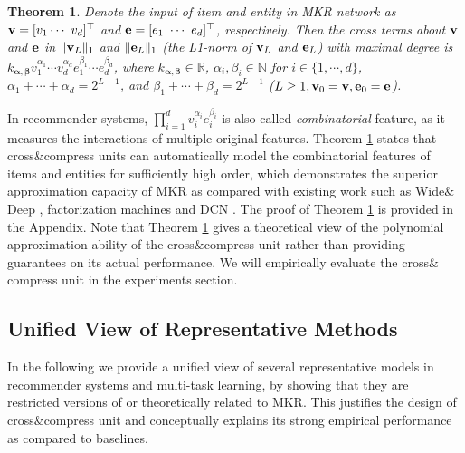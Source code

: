 \documentclass[sigconf]{acmart}
\newtheorem{theorem}{Theorem}
\begin{document}
		\begin{theorem}
		\label{thm:1}
			Denote the input of item and entity in MKR network as ${\bf v} = [v_1 \cdots \ v_d]^\top$ and ${\bf e} = [e_1 \ \cdots \ e_d]^\top$, respectively.
			Then the cross terms about ${\bf v}$ and ${\bf e}$ in $\|{\bf v}_L\|_1$ and $\|{\bf e}_L\|_1$ (the L1-norm of ${\bf v}_L$ and ${\bf e}_L$) with maximal degree is $k_{\bm \alpha, \bm \beta} v_1^{\alpha_1} \cdots v_d^{\alpha_d} e_1^{\beta_1} \cdots e_d^{\beta_d}$, where $k_{\bm \alpha, \bm \beta} \in \mathbb R$, $\alpha_i, \beta_i \in \mathbb N$ for $i \in \{1, \cdots, d\}$, $\alpha_1 + \cdots + \alpha_d = 2^{L-1}$, and $\beta_1 + \cdots + \beta_d = 2^{L-1}$ ($L \geq 1, {\bf v}_0 = {\bf v}, {\bf e}_0 = {\bf e}$).
		\end{theorem}
		
		In recommender systems, $\prod_{i=1}^d v_i^{\alpha_i} e_i^{\beta_i}$ is also called \textit{combinatorial} feature, as it measures the interactions of multiple original features.
		Theorem \ref{thm:1} states that cross$\&$compress units can automatically model the combinatorial features of items and entities for sufficiently high order, which demonstrates the superior approximation capacity of MKR as compared with existing work such as Wide$\&$Deep \cite{cheng2016wide}, factorization machines \cite{rendle2010factorization, rendle2012factorization} and DCN \cite{wang2017deep}.
		The proof of Theorem \ref{thm:1} is provided in the Appendix.
		Note that Theorem \ref{thm:1} gives a theoretical view of the polynomial approximation ability of the cross$\&$compress unit rather than providing guarantees on its actual performance.
		We will empirically evaluate the cross$\&$compress unit in the experiments section.
		
	
	\subsection{Unified View of Representative Methods}
	\label{sec:unified_view}
		In the following we provide a unified view of several representative models in recommender systems and multi-task learning, by showing that they are restricted versions of or theoretically related to MKR.
		This justifies the design of cross$\&$compress unit and conceptually explains its strong empirical performance as compared to baselines.
		
\end{document}
